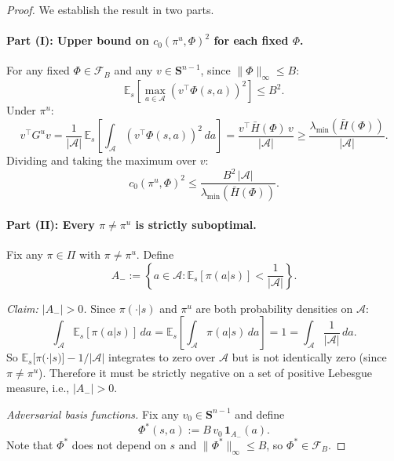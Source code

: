 \documentclass[12pt]{article}
\begin{document}
\begin{proof}
We establish the result in two parts.

\paragraph{Part (I): Upper bound on $c_0(\pi^u, \Phi)^2$ for each fixed $\Phi$.}

For any fixed $\Phi \in \mathcal{F}_B$ and any $v \in \mathbf{S}^{n-1}$,
since $\|\Phi\|_\infty \leq B$:
\begin{equation*}
\mathbb{E}_s\!\left[\max_{a \in \mathcal{A}}(v^\top\Phi(s,a))^2\right] \leq B^2.
\end{equation*}
Under $\pi^u$:
\begin{equation*}
v^\top G^u v
= \frac{1}{|\mathcal{A}|}\,\mathbb{E}_s\!\left[\int_\mathcal{A}(v^\top\Phi(s,a))^2\,da\right]
= \frac{v^\top\bar{H}(\Phi)\,v}{|\mathcal{A}|}
\geq \frac{\lambda_{\min}(\bar{H}(\Phi))}{|\mathcal{A}|}.
\end{equation*}
Dividing and taking the maximum over $v$:
\begin{equation}
c_0(\pi^u,\Phi)^2
\leq \frac{B^2\,|\mathcal{A}|}{\lambda_{\min}(\bar{H}(\Phi))}. \label{eq:part1}
\end{equation}

\paragraph{Part (II): Every $\pi \neq \pi^u$ is strictly suboptimal.}

Fix any $\pi \in \Pi$ with $\pi \neq \pi^u$. Define
\begin{equation*}
A_- := \left\{a \in \mathcal{A} :
\mathbb{E}_s[\pi(a|s)] < \frac{1}{|\mathcal{A}|}\right\}.
\end{equation*}

\textit{Claim: $|A_-| > 0$.}
Since $\pi(\cdot|s)$ and $\pi^u$ are both probability densities on $\mathcal{A}$:
\begin{equation*}
\int_\mathcal{A}\mathbb{E}_s[\pi(a|s)]\,da
= \mathbb{E}_s\!\left[\int_\mathcal{A}\pi(a|s)\,da\right] = 1
= \int_\mathcal{A}\frac{1}{|\mathcal{A}|}\,da.
\end{equation*}
So $\mathbb{E}_s[\pi(\cdot|s)] - 1/|\mathcal{A}|$ integrates to zero over
$\mathcal{A}$ but is not identically zero (since $\pi \neq \pi^u$).
Therefore it must be strictly negative on a set of positive Lebesgue measure,
i.e., $|A_-| > 0$.

\textit{Adversarial basis functions.}
Fix any $v_0 \in \mathbf{S}^{n-1}$ and define
\begin{equation*}
\Phi^*(s,a) := B\,v_0\,\mathbf{1}_{A_-}(a).
\end{equation*}
Note that $\Phi^*$ does not depend on $s$ and $\|\Phi^*\|_\infty \leq B$,
so $\Phi^* \in \mathcal{F}_B$.


\end{proof}
\end{document}
